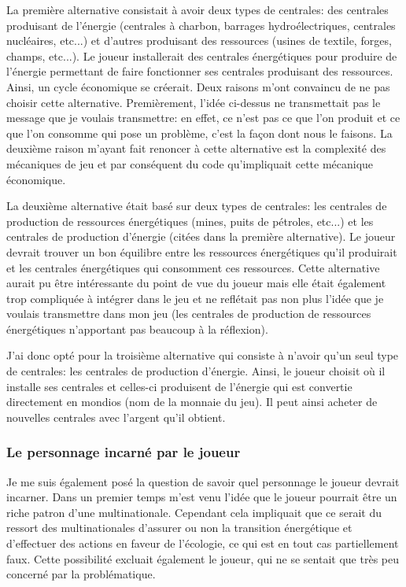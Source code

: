 \documentclass{article}
\begin{document}
        
        La première alternative consistait à avoir deux types de centrales: des centrales produisant de l'énergie (centrales à charbon, barrages hydroélectriques, centrales nucléaires, etc...) et d'autres produisant des ressources (usines de textile, forges, champs, etc...). Le joueur installerait des centrales énergétiques pour produire de l'énergie permettant de faire fonctionner ses centrales produisant des ressources. Ainsi, un cycle économique se créerait. 
        Deux raisons m'ont convaincu de ne pas choisir cette alternative. Premièrement, l'idée ci-dessus ne transmettait pas le message que je voulais transmettre: en effet, ce n'est pas ce que l'on produit et ce que l'on consomme qui pose un problème, c'est la façon dont nous le faisons. La deuxième raison m'ayant fait renoncer à cette alternative est la complexité des mécaniques de jeu et par conséquent du code qu'impliquait cette mécanique économique.
        
        
        La deuxième alternative était basé sur deux types de centrales: les centrales de production de ressources énergétiques (mines, puits de pétroles, etc...) et les centrales de production d'énergie (citées dans la première alternative). Le joueur devrait trouver un bon équilibre entre les ressources énergétiques qu'il produirait et les centrales énergétiques qui consomment ces ressources.
        Cette alternative aurait pu être intéressante du point de vue du joueur mais elle était également trop compliquée à intégrer dans le jeu et ne reflétait pas non plus l'idée que je voulais transmettre dans mon jeu (les centrales de production de ressources énergétiques n'apportant pas beaucoup à la réflexion).
        
        
        J'ai donc opté pour la troisième alternative qui consiste à n'avoir qu'un seul type de centrales: les centrales de production d'énergie. Ainsi, le joueur choisit où il installe ses centrales et celles-ci produisent de l'énergie qui est convertie directement en mondios (nom de la monnaie du jeu). Il peut ainsi acheter de nouvelles centrales avec l'argent qu'il obtient.
        
        \subsubsection{Le personnage incarné par le joueur}
        Je me suis également posé la question de savoir quel personnage le joueur devrait incarner. Dans un premier temps m'est venu l'idée que le joueur pourrait être un riche patron d'une multinationale. Cependant cela impliquait que ce serait du ressort des multinationales d'assurer ou non la transition énergétique et d'effectuer des actions en faveur de l'écologie, ce qui est en tout cas partiellement faux. Cette possibilité excluait également le joueur, qui ne se sentait que très peu concerné par la problématique.
        
\end{document}
